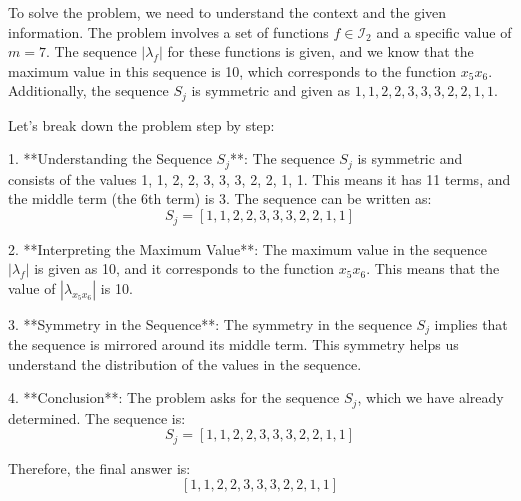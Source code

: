 To solve the problem, we need to understand the context and the given information. The problem involves a set of functions \( f \in \mathcal{I}_2 \) and a specific value of \( m = 7 \). The sequence \( |\lambda_f| \) for these functions is given, and we know that the maximum value in this sequence is 10, which corresponds to the function \( x_5x_6 \). Additionally, the sequence \( S_j \) is symmetric and given as \( 1,1,2,2,3,3,3,2,2,1,1 \).

Let's break down the problem step by step:

1. **Understanding the Sequence \( S_j \)**:
   The sequence \( S_j \) is symmetric and consists of the values 1, 1, 2, 2, 3, 3, 3, 2, 2, 1, 1. This means it has 11 terms, and the middle term (the 6th term) is 3. The sequence can be written as:
   \[
   S_j = [1, 1, 2, 2, 3, 3, 3, 2, 2, 1, 1]
   \]

2. **Interpreting the Maximum Value**:
   The maximum value in the sequence \( |\lambda_f| \) is given as 10, and it corresponds to the function \( x_5x_6 \). This means that the value of \( |\lambda_{x_5x_6}| \) is 10.

3. **Symmetry in the Sequence**:
   The symmetry in the sequence \( S_j \) implies that the sequence is mirrored around its middle term. This symmetry helps us understand the distribution of the values in the sequence.

4. **Conclusion**:
   The problem asks for the sequence \( S_j \), which we have already determined. The sequence is:
   \[
   S_j = [1, 1, 2, 2, 3, 3, 3, 2, 2, 1, 1]
   \]

Therefore, the final answer is:
\[
\boxed{[1, 1, 2, 2, 3, 3, 3, 2, 2, 1, 1]}
\]